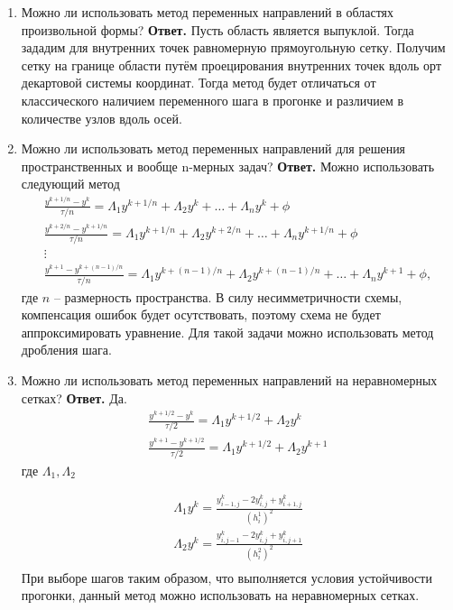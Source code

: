 \documentclass{article}
\begin{document}
\begin{enumerate}
		\item Можно ли использовать метод переменных направлений в
		областях произвольной формы?
		\newline 
		{\bfseries Ответ. } 
		Пусть область является выпуклой. 
		Тогда зададим для внутренних точек равномерную прямоугольную сетку. 
		Получим сетку на границе области путём проецирования внутренних точек вдоль 
		орт декартовой системы координат.
		Тогда метод будет отличаться от классического наличием переменного шага в прогонке
		и различием в количестве узлов вдоль осей.  
		\item Можно ли использовать метод переменных направлений
		для решения пространственных и вообще n-мерных задач?
		\newline
		{\bfseries Ответ. } 
		Можно использовать следующий метод 
		\begin{gather*}
			\frac{y^{k+1/n} - y^k}{\tau/n} = \Lambda_1 y^{k+1/n} + \Lambda_2 y^k
			+ \ldots + \Lambda_n y^k  + \phi \\
			\frac{y^{k+2/n} - y^{k+1/n}}{\tau/n} = \Lambda_1 y^{k+1/n} + \Lambda_2 y^{k+2/n}
			+ \ldots + \Lambda_n y^{k+1/n}  + \phi \\
			\vdots \\ 
			\frac{y^{k+1} - y^{k+(n-1)/n}}{\tau/n} = \Lambda_1 y^{k+(n-1)/n} + \Lambda_2 y^{k+(n-1)/n}
			+ \ldots + \Lambda_n y^{k+1}  + \phi,
		\end{gather*}
		где $n$ -- размерность пространства.
		В силу несимметричности схемы, компенсация ошибок будет осутствовать, поэтому 
		схема не будет аппроксимировать уравнение. 
		Для такой задачи можно использовать метод дробления шага.
		\item Можно ли использовать метод переменных направлений
		на неравномерных сетках?
		\newline
		{\bfseries Ответ. } 
		Да.
		\begin{gather*}
			\frac{y^{k+1/2} - y^k}{\tau/2} = \Lambda_1 y^{k+1/2} + \Lambda_2 y^k \\ 
			\frac{y^{k+1} - y^{k+1/2}}{\tau/2} = \Lambda_1 y^{k+1/2} + \Lambda_2 y^{k+1} 
		\end{gather*}
		где $\Lambda_1, \Lambda_2 $
		
		\begin{gather*}
			\Lambda_1y^k = \frac{y^k_{i-1,j} - 2y^k_{i,j} + y^k_{i+1,j}}{(h^1_i)^2} \\
			\Lambda_2y^k = \frac{y^k_{i,j-1} - 2y^k_{i,j} + y^k_{i,j+1}}{(h^2_i)^2} \\
		\end{gather*}
		При выборе шагов таким образом, что 
		выполняется условия устойчивости прогонки, данный метод можно использовать 
		на неравномерных сетках.

	\end{enumerate}
\end{document}
